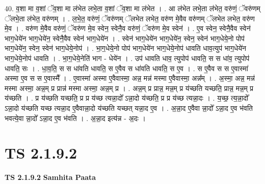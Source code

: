 \documentclass[17pt]{extarticle}
\begin{document}
40. व॒शा मा व॒शां ॅव॒शा मा ल॑भेत लभे॒ता व॒शां ॅव॒शा मा ल॑भेत । . आ ल॑भेत लभे॒ता ल॑भेत॒ वरु॑णं॒ ॅवरु॑णम् ॅलभे॒ता ल॑भेत॒ वरु॑णम् । . ल॒भे॒त॒ वरु॑णं॒ ॅवरु॑णम् ॅलभेत लभेत॒ वरु॑ण मे॒वैव वरु॑णम् ॅलभेत लभेत॒ वरु॑ण मे॒व । . वरु॑ण मे॒वैव वरु॑णं॒ ॅवरु॑ण मे॒व स्वेन॒ स्वेनै॒व वरु॑णं॒ ॅवरु॑ण मे॒व स्वेन॑ । . ए॒व स्वेन॒ स्वेनै॒वैव स्वेन॑ भाग॒धेये॑न भाग॒धेये॑न॒ स्वेनै॒वैव स्वेन॑ भाग॒धेये॑न । . स्वेन॑ भाग॒धेये॑न भाग॒धेये॑न॒ स्वेन॒ स्वेन॑ भाग॒धेये॒नो पोप॑ भाग॒धेये॑न॒ स्वेन॒ स्वेन॑ भाग॒धेये॒नोप॑ । . भा॒ग॒धेये॒नो पोप॑ भाग॒धेये॑न भाग॒धेये॒नोप॑ धावति धाव॒त्युप॑ भाग॒धेये॑न भाग॒धेये॒नोप॑ धावति । . भा॒ग॒धेये॒नेति॑ भाग - धेये॑न । . उप॑ धावति धाव॒ त्युपोप॑ धावति॒ स स धा॑व॒ त्युपोप॑ धावति॒ सः । . धा॒व॒ति॒ स स धा॑वति धावति॒ स ए॒वैव स धा॑वति धावति॒ स ए॒व । . स ए॒वैव स स ए॒वास्मा॑ अस्मा ए॒व स स ए॒वास्मै᳚ । . ए॒वास्मा॑ अस्मा ए॒वैवास्मा॒ अन्न॒ मन्न॑ मस्मा ए॒वैवास्मा॒ अन्न᳚म् । . अ॒स्मा॒ अन्न॒ मन्न॑ मस्मा अस्मा॒ अन्न॒म् प्र प्रान्न॑ मस्मा अस्मा॒ अन्न॒म् प्र । . अन्न॒म् प्र प्रान्न॒ मन्न॒म् प्र य॑च्छति यच्छति॒ प्रान्न॒ मन्न॒म् प्र य॑च्छति । . प्र य॑च्छति यच्छति॒ प्र प्र य॑च्छ त्यन्ना॒दो᳚ ऽन्ना॒दो य॑च्छति॒ प्र प्र य॑च्छ त्यन्ना॒दः । . य॒च्छ॒ त्य॒न्ना॒दो᳚ ऽन्ना॒दो य॑च्छति यच्छ त्यन्ना॒द ए॒वैवान्ना॒दो य॑च्छति यच्छत् यन्ना॒द ए॒व । . अ॒न्ना॒द ए॒वैवा न्ना॒दो᳚ ऽन्ना॒द ए॒व भ॑वति भवत्ये॒वा न्ना॒दो᳚ ऽन्ना॒द ए॒व भ॑वति । . अ॒न्ना॒द इत्य॑न्न - अ॒दः । \newline
\pagebreak
{}

\section{ TS 2.1.9.2 }

\textbf{TS 2.1.9.2 } \newline
\textbf{Samhita Paata} \newline
\end{document}
